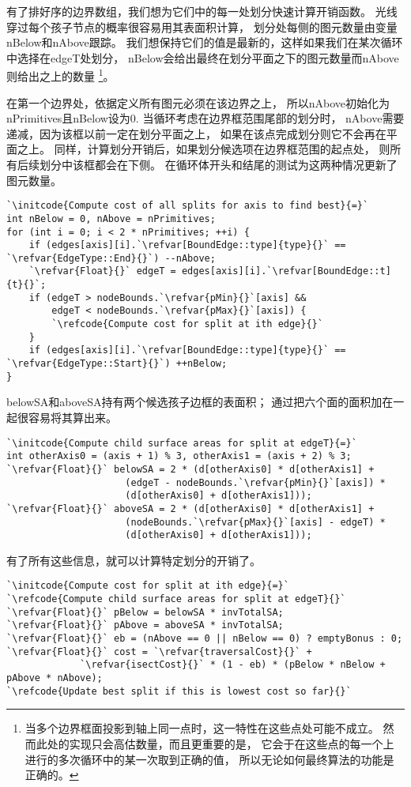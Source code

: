 有了排好序的边界数组，我们想为它们中的每一处划分快速计算开销函数。
光线穿过每个孩子节点的概率很容易用其表面积计算，
划分处每侧的图元数量由变量{\ttfamily nBelow}和{\ttfamily nAbove}跟踪。
我们想保持它们的值是最新的，这样如果我们在某次循环中选择在{\ttfamily edgeT}处划分，
{\ttfamily nBelow}会给出最终在划分平面之下的图元数量而{\ttfamily nAbove}则给出之上的数量
\footnote{当多个边界框面投影到轴上同一点时，这一特性在这些点处可能不成立。
然而此处的实现只会高估数量，而且更重要的是，
它会于在这些点的每一个上进行的多次循环中的某一次取到正确的值，
所以无论如何最终算法的功能是正确的。}。

在第一个边界处，依据定义所有图元必须在该边界之上，
所以{\ttfamily nAbove}初始化为{\ttfamily nPrimitives}且{\ttfamily nBelow}设为0.
当循环考虑在边界框范围尾部的划分时，
{\ttfamily nAbove}需要递减，因为该框以前一定在划分平面之上，
如果在该点完成划分则它不会再在平面之上。
同样，计算划分开销后，如果划分候选项在边界框范围的起点处，
则所有后续划分中该框都会在下侧。
在循环体开头和结尾的测试为这两种情况更新了图元数量。
\begin{lstlisting}
`\initcode{Compute cost of all splits for axis to find best}{=}`
int nBelow = 0, nAbove = nPrimitives;
for (int i = 0; i < 2 * nPrimitives; ++i) {
    if (edges[axis][i].`\refvar[BoundEdge::type]{type}{}` == `\refvar{EdgeType::End}{}`) --nAbove;
    `\refvar{Float}{}` edgeT = edges[axis][i].`\refvar[BoundEdge::t]{t}{}`;
    if (edgeT > nodeBounds.`\refvar{pMin}{}`[axis] &&
        edgeT < nodeBounds.`\refvar{pMax}{}`[axis]) {
        `\refcode{Compute cost for split at ith edge}{}`
    }
    if (edges[axis][i].`\refvar[BoundEdge::type]{type}{}` == `\refvar{EdgeType::Start}{}`) ++nBelow;
}
\end{lstlisting}

{\ttfamily belowSA}和{\ttfamily aboveSA}持有两个候选孩子边框的表面积；
通过把六个面的面积加在一起很容易将其算出来。
\begin{lstlisting}
`\initcode{Compute child surface areas for split at edgeT}{=}`
int otherAxis0 = (axis + 1) % 3, otherAxis1 = (axis + 2) % 3;
`\refvar{Float}{}` belowSA = 2 * (d[otherAxis0] * d[otherAxis1] +
                     (edgeT - nodeBounds.`\refvar{pMin}{}`[axis]) *
                     (d[otherAxis0] + d[otherAxis1]));
`\refvar{Float}{}` aboveSA = 2 * (d[otherAxis0] * d[otherAxis1] +
                     (nodeBounds.`\refvar{pMax}{}`[axis] - edgeT) *
                     (d[otherAxis0] + d[otherAxis1]));
\end{lstlisting}

有了所有这些信息，就可以计算特定划分的开销了。
\begin{lstlisting}
`\initcode{Compute cost for split at ith edge}{=}`
`\refcode{Compute child surface areas for split at edgeT}{}`
`\refvar{Float}{}` pBelow = belowSA * invTotalSA;
`\refvar{Float}{}` pAbove = aboveSA * invTotalSA;
`\refvar{Float}{}` eb = (nAbove == 0 || nBelow == 0) ? emptyBonus : 0;
`\refvar{Float}{}` cost = `\refvar{traversalCost}{}` +
             `\refvar{isectCost}{}` * (1 - eb) * (pBelow * nBelow + pAbove * nAbove);
`\refcode{Update best split if this is lowest cost so far}{}`
\end{lstlisting}

